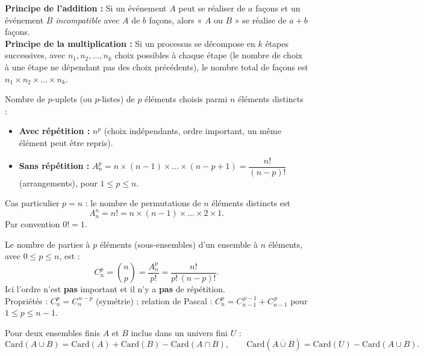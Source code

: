 \documentclass[11pt]{article}
\begin{document}
\begin{propriete}
\textbf{Principe de l'addition :} Si un événement $A$ peut se réaliser de $a$ façons et un événement $B$ \emph{incompatible} avec $A$ de $b$ façons, alors « $A$ ou $B$ » se réalise de $a+b$ façons.\\
\textbf{Principe de la multiplication :} Si un processus se décompose en $k$ étapes successives, avec $n_1, n_2, \dots, n_k$ choix possibles à chaque étape (le nombre de choix à une étape ne dépendant pas des choix précédents), le nombre total de façons est $n_1 \times n_2 \times \dots \times n_k$.
\end{propriete}

\begin{propriete}
Nombre de $p$-uplets (ou $p$-listes) de $p$ éléments choisis parmi $n$ éléments distincts :
\begin{itemize}
    \item \textbf{Avec répétition :} $n^p$ (choix indépendants, ordre important, un même élément peut être repris).
    \item \textbf{Sans répétition :} $A_n^p = n \times (n-1) \times \dots \times (n-p+1) = \dfrac{n!}{(n-p)!}$ (arrangements), pour $1 \le p \le n$.
\end{itemize}
\end{propriete}

\begin{propriete}[Permutations]
Cas particulier $p=n$ : le nombre de permutations de $n$ éléments distincts est
\[
A_n^n = n! = n \times (n-1) \times \dots \times 2 \times 1.
\]
Par convention $0! = 1$.
\end{propriete}

\begin{propriete}[Combinaisons]
Le nombre de parties à $p$ éléments (sous-ensembles) d'un ensemble à $n$ éléments, avec $0 \le p \le n$, est :
\[
C_n^p = \binom{n}{p} = \frac{A_n^p}{p!} = \frac{n!}{p!\,(n-p)!}.
\]
Ici l'ordre n'est \textbf{pas} important et il n'y a \textbf{pas} de répétition.\\
Propriétés : $C_n^p = C_n^{\,n-p}$ (symétrie) ; relation de Pascal : $C_n^p = C_{n-1}^{\,p-1} + C_{n-1}^{\,p}$ pour $1 \le p \le n-1$.
\end{propriete}

\begin{propriete}
Pour deux ensembles finis $A$ et $B$ inclus dans un univers fini $U$ :
\[
\mathrm{Card}(A \cup B) = \mathrm{Card}(A) + \mathrm{Card}(B) - \mathrm{Card}(A \cap B),
\qquad
\mathrm{Card}(\overline{A \cup B}) = \mathrm{Card}(U) - \mathrm{Card}(A \cup B).
\]
\end{propriete}
\end{document}
